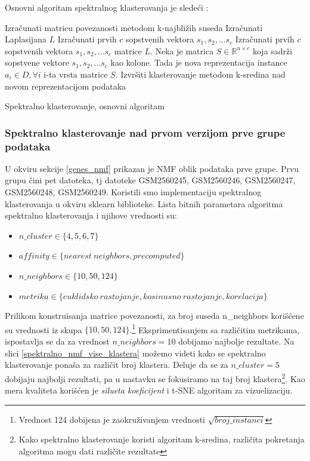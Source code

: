 \documentclass[a4paper]{article}
\begin{document}
Osnovni algoritam spektralnog klasterovanja je sledeći \cite{von2007tutorial}:


\begin{minipage}{0.9\linewidth}%
\begin{algorithm}[H]
\SetAlgoLined
{}
Izračunati matricu povezanosti metodom k-najbližih suseda\;
Izračunati Laplasijana $L$\;
Izračunati prvih $c$ sopstvenih vektora $s_1, s_2, ... s_c$\;
Izračunati prvih $c$ sopstvenih vektora $s_1, s_2, ... s_c$ matrice $L$. Neka je matrica $S \in \mathbb{R}^{n \times c}$ koja sadrži sopstvene vektore $s_1, s_2, ... s_c$ kao kolone. Tada je nova reprezentacija instance $a_i \in D, \forall i$ i-ta vrsta matrice $S$.\;
Izvršiti klasterovanje metodom k-sredina nad novom reprezentacijom podataka\;
 \caption{Spektralno klasterovanje, osnovni algoritam}
\end{algorithm}
\end{minipage}

\verb||

\subsubsection{Spektralno klasterovanje nad prvom verzijom prve grupe podataka}
U okviru sekcije \ref{genes_nmf} prikazan je NMF oblik podataka prve grupe. Prvu grupu čini pet datoteka, tj datoteke GSM2560245, GSM2560246, GSM2560247, GSM2560248, GSM2560249. Koristili smo implementaciju spektralnog klasterovanja u okviru sklearn biblioteke. Lista bitnih parametara algoritma spektralno klasterovanja i njihove vrednosti su:
\begin{itemize}
\item $n\_cluster \in \{4, 5, 6, 7\}$
\item $affinity \in  \{nearest\ neighbors, precomputed\}$
\item $n\_neighbors \in \{10, 50, 124\}$
\item $metrika \in \{euklidsko\ rastojanje, kosinusno\ rastojanje, korelacija\}$
\end{itemize}

Prilikom konstruisanja matrice povezanosti, za broj suseda n\_neighbors korišćene su vrednosti iz skupa
$\{10, 50, 124\}$.\footnote{Vrednost 124 dobijena je zaokruživanjem vrednosti $\sqrt{broj\_instanci}$} Eksprimentisanjem sa različitim metrikama, ispostavlja se da za vrednost $n\_neighbors = 10$ dobijamo najbolje rezultate. Na slici \ref{spektralno_nmf_vise_klastera} možemo videti kako se spektralno klasterovanje ponaša za različit broj klastera. Deluje da se za $n\_cluster = 5$ dobijaju najbolji rezultati, pa u nastavku se fokusiramo na taj broj klastera\footnote{Kako spektralno klasterovanje koristi algoritam k-sredina, različita pokretanja algoritma mogu dati različite rezultate}. Kao mera kvaliteta korišćen je \textit{silueta koeficijent} i t-SNE algoritam za vizuelizaciju.
\end{document}
